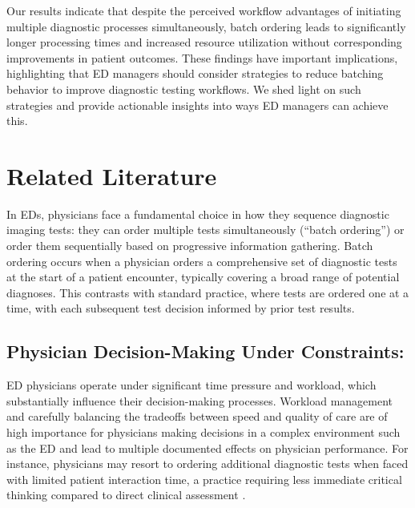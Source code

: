 \documentclass[,,nonblindrev]{informs}
\begin{document}
Our results indicate that despite the perceived workflow advantages of
initiating multiple diagnostic processes simultaneously, batch ordering
leads to significantly longer processing times and increased resource
utilization without corresponding improvements in patient outcomes.
These findings have important implications, highlighting that ED
managers should consider strategies to reduce batching behavior to
improve diagnostic testing workflows. We shed light on such strategies
and provide actionable insights into ways ED managers can achieve this.

\section{Related Literature}\label{related-literature}

In EDs, physicians face a fundamental choice in how they sequence
diagnostic imaging tests: they can order multiple tests simultaneously
(``batch ordering'') or order them sequentially based on progressive
information gathering. Batch ordering occurs when a physician orders a
comprehensive set of diagnostic tests at the start of a patient
encounter, typically covering a broad range of potential diagnoses. This
contrasts with standard practice, where tests are ordered one at a time,
with each subsequent test decision informed by prior test results.

\subsection{Physician Decision-Making Under
Constraints:}\label{physician-decision-making-under-constraints}

ED physicians operate under significant time pressure and workload,
which substantially influence their decision-making processes. Workload
management and carefully balancing the tradeoffs between speed and
quality of care are of high importance for physicians making decisions
in a complex environment such as the ED
\citep[\citet{leppink2019mental}]{Saghafian2018} and lead to multiple
documented effects on physician performance. For instance, physicians
may resort to ordering additional diagnostic tests when faced with
limited patient interaction time, a practice requiring less immediate
critical thinking compared to direct clinical assessment
\citep[\citet{pines2009trends}]{batt2016early}.
\end{document}
